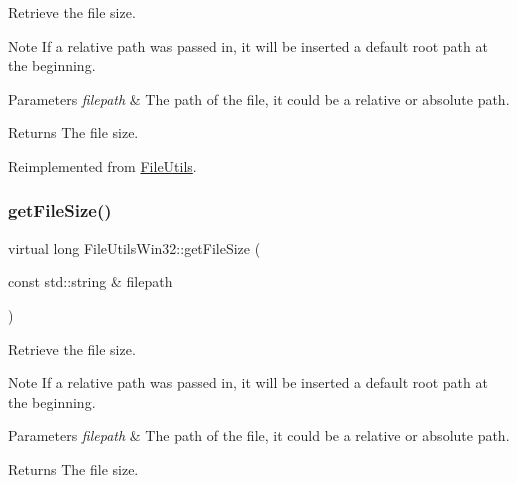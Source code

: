 Retrieve the file size.

\begin{DoxyNote}{Note}
If a relative path was passed in, it will be inserted a default root path at the beginning. 
\end{DoxyNote}

\begin{DoxyParams}{Parameters}
{\em filepath} & The path of the file, it could be a relative or absolute path. \\
\hline
\end{DoxyParams}
\begin{DoxyReturn}{Returns}
The file size. 
\end{DoxyReturn}


Reimplemented from \hyperlink{classFileUtils_a1804c928fb8897e07e181a8e72362e0a}{File\+Utils}.

\mbox{\label{classFileUtilsWin32_a55d29e8e6cf19e0863dd68a545583f63}} 
\subsubsection{\texorpdfstring{get\+File\+Size()}{getFileSize()}\hspace{0.1cm}{\footnotesize\ttfamily [2/3]}}
{\footnotesize\ttfamily virtual long File\+Utils\+Win32\+::get\+File\+Size (\begin{DoxyParamCaption}\item[{const std\+::string \&}]{filepath }\end{DoxyParamCaption})\hspace{0.3cm}{\ttfamily [virtual]}}

Retrieve the file size.

\begin{DoxyNote}{Note}
If a relative path was passed in, it will be inserted a default root path at the beginning. 
\end{DoxyNote}

\begin{DoxyParams}{Parameters}
{\em filepath} & The path of the file, it could be a relative or absolute path. \\
\hline
\end{DoxyParams}
\begin{DoxyReturn}{Returns}
The file size. 
\end{DoxyReturn}


